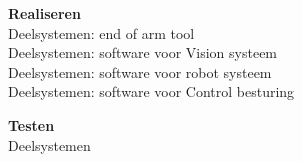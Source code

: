 \begin{titlepage}
	\vspace{5mm}
	\textbf{Realiseren}
	\\Deelsystemen: end of arm tool
  \\Deelsystemen: software voor Vision systeem
  \\Deelsystemen: software voor robot systeem
  \\Deelsystemen: software voor Control besturing
	
	\vspace{5mm}
	\textbf{Testen}
	\\Deelsystemen
	

\end{titlepage}


